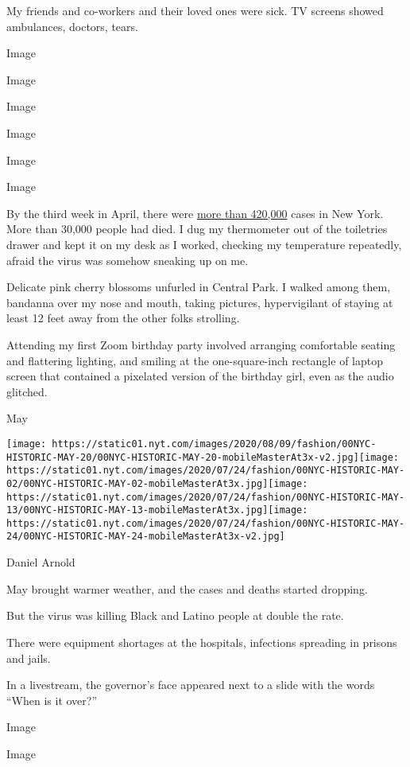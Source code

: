 My friends and co-workers and their loved ones were sick. TV screens
showed ambulances, doctors, tears.

Image

Image

Image

Image

Image

Image

By the third week in April, there were
\href{https://www.nytimes.com/2020/04/13/nyregion/coronavirus-new-york-update.html}{more
than 420,000} cases in New York. More than 30,000 people had died. I dug
my thermometer out of the toiletries drawer and kept it on my desk as I
worked, checking my temperature repeatedly, afraid the virus was somehow
sneaking up on me.

Delicate pink cherry blossoms unfurled in Central Park. I walked among
them, bandanna over my nose and mouth, taking pictures, hypervigilant of
staying at least 12 feet away from the other folks strolling.

Attending my first Zoom birthday party involved arranging comfortable
seating and flattering lighting, and smiling at the one-square-inch
rectangle of laptop screen that contained a pixelated version of the
birthday girl, even as the audio glitched.

May

\texttt{[image: https://static01.nyt.com/images/2020/08/09/fashion/00NYC-HISTORIC-MAY-20/00NYC-HISTORIC-MAY-20-mobileMasterAt3x-v2.jpg]}\texttt{[image: https://static01.nyt.com/images/2020/07/24/fashion/00NYC-HISTORIC-MAY-02/00NYC-HISTORIC-MAY-02-mobileMasterAt3x.jpg]}\texttt{[image: https://static01.nyt.com/images/2020/07/24/fashion/00NYC-HISTORIC-MAY-13/00NYC-HISTORIC-MAY-13-mobileMasterAt3x.jpg]}\texttt{[image: https://static01.nyt.com/images/2020/07/24/fashion/00NYC-HISTORIC-MAY-24/00NYC-HISTORIC-MAY-24-mobileMasterAt3x-v2.jpg]}

Daniel Arnold

May brought warmer weather, and the cases and deaths started dropping.

But the virus was killing Black and Latino people at double the rate.

There were equipment shortages at the hospitals, infections spreading in
prisons and jails.

In a livestream, the governor's face appeared next to a slide with the
words ``When is it over?''

Image

Image

